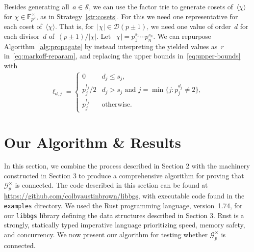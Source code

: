 \documentclass{article}
\theoremstyle{definition}
\theoremstyle{remark}
\begin{document}
Besides generating all~$a \in \mathcal{S}$, we can use the factor trie to generate cosets of~$\langle \chi \rangle$ for $\chi \in \mathbb{F}_{p^2}^\times$, as in Strategy~\ref{str:cosets}.
For this we need one representative for each coset of~$\langle\chi\rangle$.
That is, for~$|\chi| \in \mathcal{D}(p \pm 1)$, we need one value of order~$d$ for each divisor~$d$ of~$(p \pm 1) / |\chi|$.
Let~$|\chi| = p_1^{s_1}\cdots p_n^{s_n}$.
We can repurpose Algorithm~\ref{alg:propagate} by instead interpreting the yielded values as~$r$ in~\eqref{eq:markoff-reparam}, and replacing the upper bounds in~\eqref{eq:upper-bounds} with
\begin{align}\label{eq:quotient-limit}
    \ell_{d,j} =
    \begin{cases}
        0 & d_j \leq s_j, \\
        p_j^{t_j} / 2 & d_j > s_j \text{ and } j = \min\{j : p_j^{d_j} \neq 2\}, \\
        p_j^{t_j} & \text{otherwise}.
    \end{cases}
\end{align}

\section{Our Algorithm \& Results}

In this section, we combine the process described in Section 2 with the machinery constructed in Section 3 to produce a comprehensive algorithm for proving that~$\mathcal{G}^\times_p$ is connected.
The code described in this section can be found at \url{https://github.com/colbyaustinbrown/libbgs}, with executable code found in the \texttt{examples} directory.
We used the Rust programming language, version~1.74, for our \texttt{libbgs} library defining the data structures described in Section 3.
Rust is a strongly, statically typed imperative language prioritizing speed, memory safety, and concurrency.
We now present our algorithm for testing whether $\mathcal{G}_p^\times$ is connected.
\end{document}
